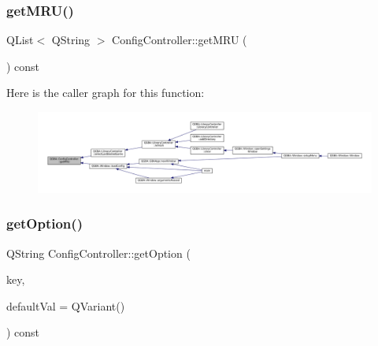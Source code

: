 \mbox{\label{class_q_g_b_a_1_1_config_controller_a27200ffdc0e855790c1f13196c8990ef}} 
\subsubsection{\texorpdfstring{get\+M\+R\+U()}{getMRU()}}
{\footnotesize\ttfamily Q\+List$<$ Q\+String $>$ Config\+Controller\+::get\+M\+RU (\begin{DoxyParamCaption}{ }\end{DoxyParamCaption}) const}

Here is the caller graph for this function\+:
\nopagebreak
\begin{figure}[H]
\begin{center}
\leavevmode
\includegraphics[width=350pt]{class_q_g_b_a_1_1_config_controller_a27200ffdc0e855790c1f13196c8990ef_icgraph}
\end{center}
\end{figure}
\mbox{\label{class_q_g_b_a_1_1_config_controller_a9c0190d19267446ec9959084664fb1a2}} 
\subsubsection{\texorpdfstring{get\+Option()}{getOption()}\hspace{0.1cm}{\footnotesize\ttfamily [1/2]}}
{\footnotesize\ttfamily Q\+String Config\+Controller\+::get\+Option (\begin{DoxyParamCaption}\item[{const char $\ast$}]{key,  }\item[{const Q\+Variant \&}]{default\+Val = {\ttfamily QVariant()} }\end{DoxyParamCaption}) const}

